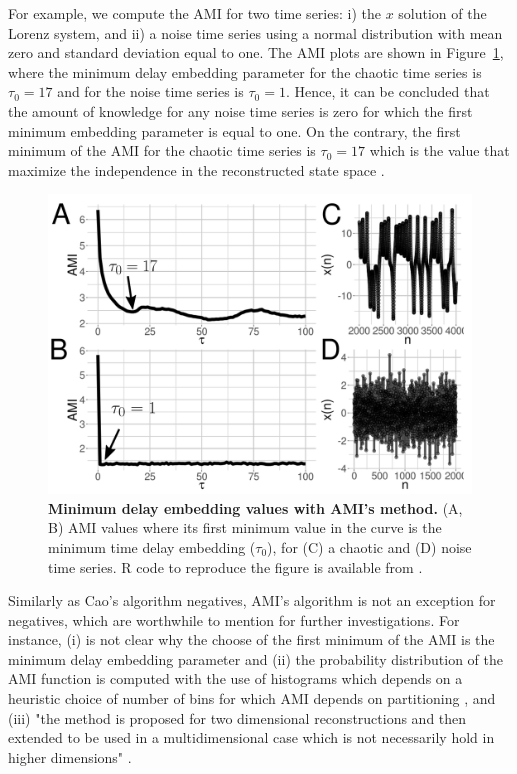 For example, we compute the AMI for two time series:
i) the $x$ solution of the Lorenz system, and
ii) a noise time series using a normal distribution with mean zero and standard deviation
equal to one. 
The AMI plots are shown in Figure~\ref{fig:amis}, where 
the minimum delay embedding parameter for the chaotic time series
is $\tau_0=17$ and for the noise time series is  $\tau_0=1$. 
Hence, it can be concluded that the amount of knowledge for any noise time series is zero
for which the first minimum embedding parameter is equal to one. On the
contrary, the first minimum of the AMI for the chaotic time series is $\tau_0=17$
which is the value that maximize the independence in the reconstructed
state space \cite{bradley2015}.
\begin{figure}[!h]
  \centering
  \includegraphics[width=1.0\textwidth]{ami}
    \caption{
	{\bf Minimum delay embedding values with AMI's method.} 
    	(A, B) AMI values where its first minimum value in the curve
	is the minimum time delay embedding ($\tau_0$), 
	for (C) a chaotic and (D) noise time series.
	R code to reproduce the figure is available from \cite{hwum2018}.
        }
    \label{fig:amis}
\end{figure}

Similarly as Cao's algorithm negatives, AMI's algorithm is not an
exception for negatives, which are worthwhile to mention for further investigations.
For instance, (i) is not clear why the choose of the first minimum of the AMI is
 the minimum delay embedding parameter \cite{kantz2003} and 
(ii) the probability distribution of the AMI function is computed
with the use of histograms which depends on a heuristic choice of number of bins
for which AMI depends on partitioning \cite{garcia2005e71}, and
(iii) "the method is proposed for two dimensional reconstructions and then 
extended to be used in a multidimensional case which is not necessarily hold in higher dimensions" 
\cite{gomezgarcia2014}.


